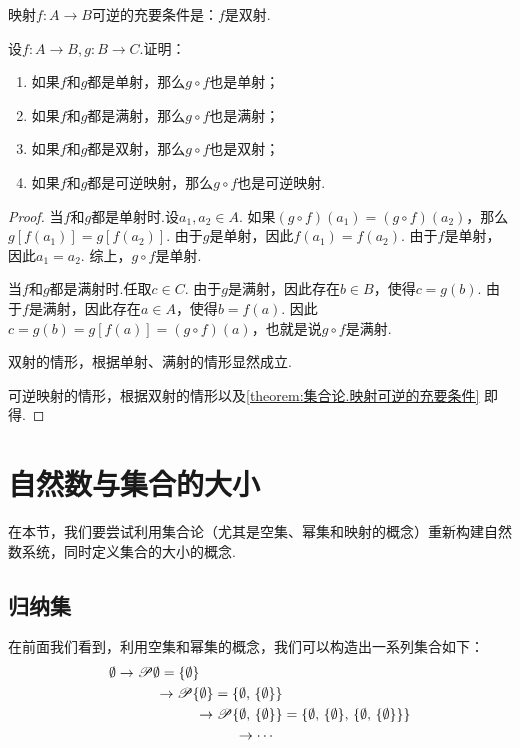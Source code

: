 \begin{theorem}\label{theorem:集合论.映射可逆的充要条件}
映射\(f\colon A \to B\)可逆的充要条件是：\(f\)是双射.
\end{theorem}

\begin{example}
设\(f\colon A \to B, g\colon B \to C\).证明：\begin{enumerate}
\item 如果\(f\)和\(g\)都是单射，那么\(g \circ f\)也是单射；
\item 如果\(f\)和\(g\)都是满射，那么\(g \circ f\)也是满射；
\item 如果\(f\)和\(g\)都是双射，那么\(g \circ f\)也是双射；
\item 如果\(f\)和\(g\)都是可逆映射，那么\(g \circ f\)也是可逆映射.
\end{enumerate}
\begin{proof}
当\(f\)和\(g\)都是单射时.设\(a_1,a_2 \in A\).
如果\((g \circ f)(a_1) = (g \circ f)(a_2)\)，那么\(g[f(a_1)] = g[f(a_2)]\).
由于\(g\)是单射，因此\(f(a_1) = f(a_2)\).
由于\(f\)是单射，因此\(a_1 = a_2\).
综上，\(g \circ f\)是单射.

当\(f\)和\(g\)都是满射时.任取\(c \in C\).
由于\(g\)是满射，因此存在\(b \in B\)，使得\(c = g(b)\).
由于\(f\)是满射，因此存在\(a \in A\)，使得\(b = f(a)\).
因此\(c = g(b) = g[f(a)] = (g \circ f)(a)\)，也就是说\(g \circ f\)是满射.

双射的情形，根据单射、满射的情形显然成立.

可逆映射的情形，根据双射的情形以及\cref{theorem:集合论.映射可逆的充要条件} 即得.
\end{proof}
\end{example}

\section{自然数与集合的大小}
在本节，我们要尝试利用集合论（尤其是空集、幂集和映射的概念）重新构建自然数系统，同时定义集合的大小的概念.

\subsection{归纳集}
在前面我们看到，利用空集和幂集的概念，我们可以构造出一系列集合如下：
\[\begin{aligned}
\emptyset
&\to
\Powerset\emptyset = \NaturalSet{1} \\
&\hspace{1cm}\to
\Powerset\NaturalSet{1} = \NaturalSet{2} \\
&\hspace{2cm}\to
\Powerset\NaturalSet{2} = \NaturalSet{3} \\
&\hspace{3cm}\to
\dotsb
\end{aligned}\]

